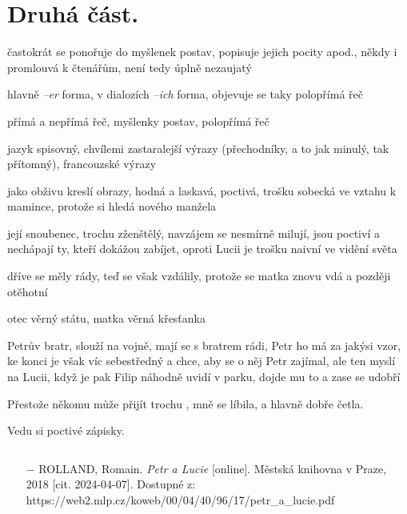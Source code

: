 \documentclass{article}
\begin{document}
\section{Druhá část.}
\begin{description}
    \setlength\itemsep{0.15em}
    \item[vypravěč:] častokrát se ponořuje do myšlenek postav, popisuje jejich pocity apod., někdy i promlouvá k čtenářům, není tedy úplně nezaujatý
    \item[vyprávěcí způsoby:] hlavně \textit{--er} forma, v dialozích \textit{--ich} forma, objevuje se taky polopřímá řeč
    \item[typy promluv:] přímá a nepřímá řeč, myšlenky postav, polopřímá řeč
    \item[jazyková stránka:] jazyk spisovný, chvílemi zastaralejší výrazy (přechodníky, a to jak minulý, tak přítomný), francouzské výrazy
    \item[postavy:]
        \begin{description}
            \setlength\itemsep{0.15em}
            \item[Lucie,] jako obživu kreslí obrazy, hodná a laskavá, poctivá, trošku sobecká ve vztahu k mamince, protože si hledá nového manžela
            \item[Petr,] její snoubenec, trochu zženštělý, navzájem se nesmírně milují, jsou poctiví a nechápají ty, kteří dokážou zabíjet, oproti Lucii je trošku naivní ve vidění světa
            \item[Luciina matka,] dříve se měly rády, teď se však vzdálily, protože se matka znovu vdá a později otěhotní
            \item[Petrovi rodiče,] otec věrný státu, matka věrná křesťanka
            \item[Filip,] Petrův bratr, slouží na vojně, mají se s bratrem rádi, Petr ho má za jakýsi vzor, ke konci je však víc sebestředný a chce, aby se o něj Petr zajímal, ale ten myslí na Lucii, když je pak Filip náhodně uvidí v parku, dojde mu to a zase se udobří
        \end{description}
    \item[názor:] Přestože někomu může přijít trochu , mně se líbila, a hlavně dobře četla. 
    \item[kontext:] Vedu si poctivé zápisky.
    \item[zdroje:] $ $
    \begin{itemize}
        \setlength\itemsep{0em}
        \item[$-$] ROLLAND, Romain. \textit{Petr a Lucie} [online]. Městská knihovna v Praze, 2018 [cit. 2024-04-07]. Dostupné z: https://web2.mlp.cz/koweb/00/04/40/96/17/petr\_a\_lucie.pdf
    \end{itemize}
\end{description}
\end{document}
